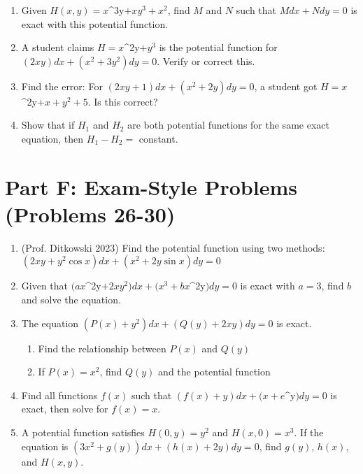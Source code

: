\documentclass[12pt]{article}
\begin{document}
\begin{enumerate}[start=22]
\item Given $H(x,y) = x$^{3y}$ + xy^{3} + x^{2}$, find $M$ and $N$ such that $Mdx + Ndy = 0$ is exact with this potential function.

\item A student claims $H = x$^{2y}$ + y^{3}$ is the potential function for $(2xy)dx + (x^{2} + 3y^{2})dy = 0$. Verify or correct this.

\item Find the error: For $(2xy + 1)dx + (x^{2} + 2y)dy = 0$, a student got $H = x$^{2y}$ + x + y^{2} + 5$. Is this correct?

\item Show that if $H_{1}$ and $H_{2}$ are both potential functions for the same exact equation, then $H_{1} - H_{2} = $ constant.
\end{enumerate}

\section*{Part F: Exam-Style Problems (Problems 26-30)}

\begin{enumerate}[start=26]
\item (Prof. Ditkowski 2023) Find the potential function using two methods:
$(2xy + y^{2}\cos x)dx + (x^{2} + 2y\sin x)dy = 0$

\item Given that $(ax$^{2y}$ + 2xy^{2})dx + (x^{3} + bx$^{2y}$)dy = 0$ is exact with $a = 3$, find $b$ and solve the equation.

\item The equation $(P(x) + y^{2})dx + (Q(y) + 2xy)dy = 0$ is exact.
\begin{enumerate}[label=(\alph*)]
    \item Find the relationship between $P(x)$ and $Q(y)$
    \item If $P(x) = x^{2}$, find $Q(y)$ and the potential function
\end{enumerate}

\item Find all functions $f(x)$ such that $(f(x) + y)dx + (x + e$^{y}$)dy = 0$ is exact, then solve for $f(x) = x$.

\item A potential function satisfies $H(0,y) = y^{2}$ and $H(x,0) = x^{3}$. If the equation is $(3x^{2} + g(y))dx + (h(x) + 2y)dy = 0$, find $g(y)$, $h(x)$, and $H(x,y)$.
\end{enumerate}
\end{document}
